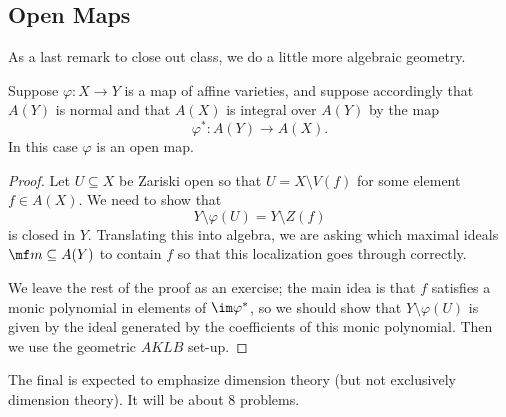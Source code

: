 \documentclass[../notes.tex]{subfiles}
\begin{document}
\subsection{Open Maps}
As a last remark to close out class, we do a little more algebraic geometry. 
\begin{theorem}
	Suppose $\varphi\colon X\to Y$ is a map of affine varieties, and suppose accordingly that $A(Y)$ is normal and that $A(X)$ is integral over $A(Y)$ by the map
	\[\varphi^*\colon A(Y)\to A(X).\]
	In this case $\varphi$ is an open map.
\end{theorem}
\begin{proof}
	Let $U\subseteq X$ be Zariski open so that $U=X\setminus V(f)$ for some element $f\in A(X)$. We need to show that
	\[Y\setminus\varphi(U)=Y\setminus Z(f)\]
	is closed in $Y$. Translating this into algebra, we are asking which maximal ideals $\mf m\subseteq A(Y)$ to contain $f$ so that this localization goes through correctly.
	
	We leave the rest of the proof as an exercise; the main idea is that $f$ satisfies a monic polynomial in elements of $\im\varphi^*$, so we should show that $Y\setminus\varphi(U)$ is given by the ideal generated by the coefficients of this monic polynomial. Then we use the geometric $AKLB$ set-up.
\end{proof}
\begin{remark}
	The final is expected to emphasize dimension theory (but not exclusively dimension theory). It will be about 8 problems.
\end{remark}
\end{document}
